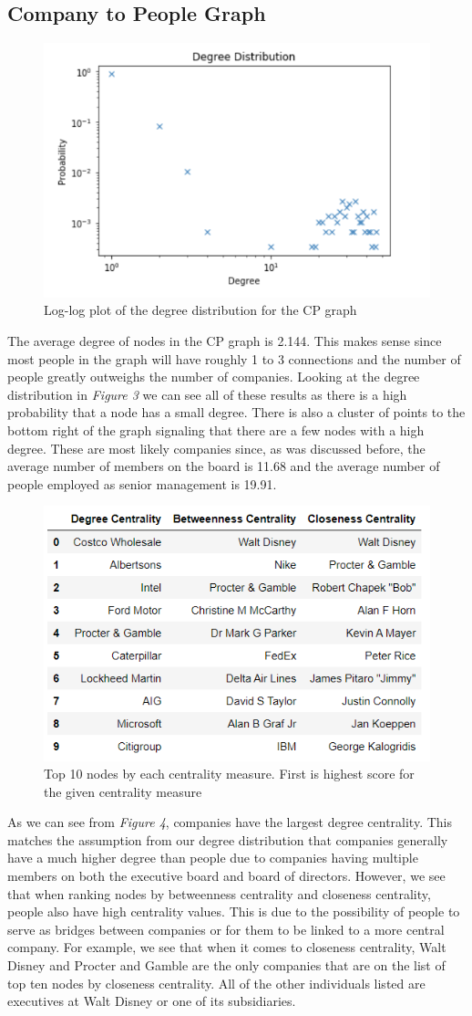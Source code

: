 \documentclass[a4paper]{article}
\begin{document}
\subsection*{Company to People Graph}
\begin{figure}[h]
    \centering
    \includegraphics[width=.55\linewidth]{./graphs/CP_deg_dist_loglog.png}
    \caption{Log-log plot of the degree distribution for the CP graph}
\end{figure}
The average degree of nodes in the CP graph is 2.144. This makes sense since most people in the graph will have roughly 1 to 3 connections and the number of people greatly outweighs the number of companies. Looking at the degree distribution in \textit{Figure 3} we can see all of these results as there is a high probability that a node has a small degree. There is also a cluster of points to the bottom right of the graph signaling that there are a few nodes with a high degree. These are most likely companies since, as was discussed before, the average number of members on the board is 11.68 and the average number of people employed as senior management is 19.91. \par
\begin{figure}[h]
    \centering
    \includegraphics[width=.5\linewidth]{./graphs/centrality_CP.png}
    \caption{Top 10 nodes by each centrality measure. First is highest score for the given centrality measure}
\end{figure}
As we can see from \textit{Figure 4}, companies have the largest degree centrality. This matches the assumption from our degree distribution that companies generally have a much higher degree than people due to companies having multiple members on both the executive board and board of directors. However, we see that when ranking nodes by betweenness centrality and closeness centrality, people also have high centrality values. This is due to the possibility of people to serve as bridges between companies or for them to be linked to a more central company. For example, we see that when it comes to closeness centrality, Walt Disney and Procter and Gamble are the only companies that are on the list of top ten nodes by closeness centrality. All of the other individuals listed are executives at Walt Disney or one of its subsidiaries. 
\end{document}
